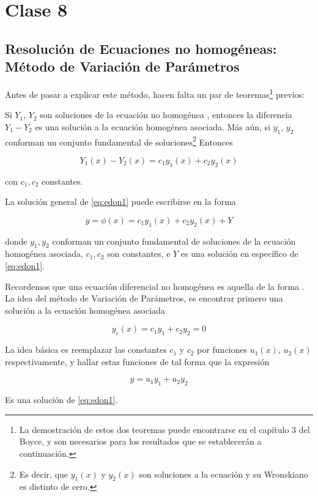 \section{Clase 8}
\subsection{Resolución de Ecuaciones no homogéneas: Método de Variación de Parámetros}

Antes de pasar a explicar este método, hacen falta un par de teoremas\footnote{La demostración de estos dos teoremas puede encontrarse en el capítulo 3 del Boyce, y son necesarios para los resultados que se establecerán a continuación.} previos:

\begin{teo}
    Si $Y_1$, $Y_2$ son soluciones de la ecuación no homogénea , entonces la diferencia $Y_1 - Y_2$ es una solución a la ecuación homogénea asociada. Más aún, si $y_1$, $y_2$ conforman un conjunto fundamental de soluciones\footnote{Es decir, que $y_1(x)$ y $y_2(x)$ son soluciones a la ecuación y su Wronskiano es distinto de cero.} Entonces

    \[
        Y_1(x) - Y_2(x) = c_1y_1(x) + c_2y_2(x)
    \]

    \noindent con $c_1, c_2$ constantes.
\end{teo}

\begin{teo}
    La solución general de \ref{eq:edon1} puede escribirse en la forma

    \[
        y = \phi(x) = c_1y_1(x) + c_2y_2(x) + Y
    \]

    \noindent donde $y_1, y_2$ conforman un conjunto fundamental de soluciones de la ecuación homogénea asociada, $c_1, c_2$ son constantes, e $Y$ es una solución en específico de \ref{eq:edon1}.
\end{teo}

Recordemos que una ecuación diferencial no homogénea es aquella de la forma . La idea del método de Variación de Parámetros, es encontrar primero una solución a la ecuación homogénea asociada

\[
    y_c(x) = c_1y_1 + c_2y_2 = 0
\]

La idea básica es reemplazar las constantes $c_1$ y $c_2$ por funciones $u_1(x)$, $u_2(x)$ respectivamente, y hallar estas funciones de tal forma que la expresión

\[
    y = u_1y_1 + u_2y_2
\]

Es una solución de \ref{eq:edon1}.

